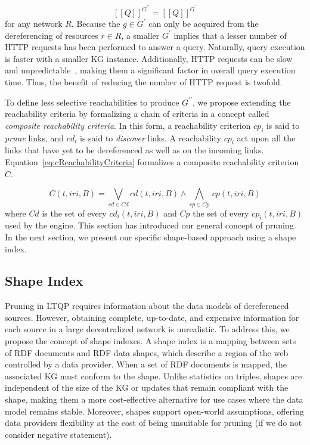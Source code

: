 \begin{equation}\label{eq:evalQueryStructuralAssumption}
   [\![ Q ]\!]^{G^{\prime\prime}} = [\![ Q ]\!]^{G^{\prime}}
\end{equation}
for any network $R$.
Because the $g \in G^{\prime}$ can only be acquired from the dereferencing of resources $r \in R$, a smaller $G^\prime$ implies that a lesser number of HTTP requests has been performed to answer a query.
Naturally, query execution is faster with a smaller KG instance.
Additionally, HTTP requests can be slow and unpredictable~\cite{hartig2016walking}, making them a significant factor in overall query execution time. 
Thus, the benefit of reducing the number of HTTP request is twofold.

To define less selective reachabilities to produce $G^{\prime\prime}$, we propose extending the reachability criteria by formalizing a chain of criteria in a concept called \emph{composite reachability criteria}.
In this form, a reachability criterion $cp_i$ is said to \emph{prune} links, and $cd_i$ is said to \emph{discover} links.
A reachability $cp_i$ act upon all the links that have yet to be dereferenced as well as on the incoming links.
Equation~\ref{eq:cReachabilityCriteria} formalizes a composite reachability criterion $C$.

\begin{equation}\label{eq:cReachabilityCriteria}
   C(t, iri, B) = \bigvee_{cd \in Cd} cd(t, iri, B) \mathrel{\land} \bigwedge_{cp \in Cp} \, cp(t, iri, B)
\end{equation}
where $Cd$ is the set of every $cd_i(t, iri, B)$ and $Cp$ the set of every $cp_i(t, iri, B)$ used by the engine.
This section has introduced our general concept of pruning. 
In the next section, we present our specific shape-based approach using a shape index.

\subsection{Shape Index}

Pruning in LTQP requires information about the data models of dereferenced sources.
However, obtaining complete, up-to-date, and expensive information for each source in a large decentralized network is unrealistic.
To address this, we propose the concept of shape indexes. 
A shape index is a mapping between sets of RDF documents and RDF data shapes, which describe a region of the web controlled by a data provider.
When a set of RDF documents is mapped, the associated KG must conform to the shape.
Unlike statistics on triples, shapes are independent of the size of the KG or updates that remain compliant with the shape, making them a more cost-effective alternative for use cases where the data model remains stable. 
Moreover, shapes support open-world assumptions, offering data providers flexibility at the cost of being unsuitable for pruning (if we do not consider negative statement).

